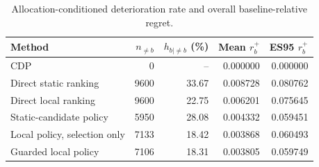 \begin{table}[!htbp]\centering
\small
\caption{Allocation-conditioned deterioration rate and overall baseline-relative regret.}\label{tab:reliability_conditional}
\begin{tabularx}{\linewidth}{Xrrrr}\toprule
Method & $n_{\ne b}$ & $h_{b\mid\ne b}$ (\%) & Mean $r_b^+$ & ES95 $r_b^+$\\\midrule
CDP & 0 & -- & 0.000000 & 0.000000\\
Direct static ranking & 9600 & 33.67 & 0.008728 & 0.080762\\
Direct local ranking & 9600 & 22.75 & 0.006201 & 0.075645\\
Static-candidate policy & 5950 & 28.08 & 0.004332 & 0.059451\\
Local policy, selection only & 7133 & 18.42 & 0.003868 & 0.060493\\
Guarded local policy & 7106 & 18.31 & 0.003805 & 0.059749\\
\bottomrule\end{tabularx}
\end{table}
